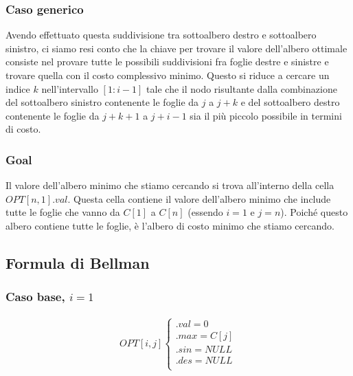 \subsubsection*{Caso generico}

Avendo effettuato questa suddivisione tra sottoalbero destro e sottoalbero sinistro, ci siamo resi conto che la chiave per trovare il valore dell'albero 
ottimale consiste nel provare tutte le possibili suddivisioni fra foglie destre e sinistre e trovare quella con il costo complessivo minimo. Questo si riduce a 
cercare un indice $k$ nell'intervallo $[1 : i - 1]$ tale che il nodo risultante dalla combinazione del sottoalbero sinistro contenente le foglie da $j$ a $j + k$ e del 
sottoalbero destro contenente le foglie da $j + k +1$ a $j + i - 1$ sia il più piccolo possibile in termini di costo.

\newpage
\subsubsection*{Goal}

Il valore dell'albero minimo che stiamo cercando si trova all'interno della cella $OPT[n,1].val$. 
Questa cella contiene il valore dell'albero minimo che include tutte le foglie che vanno da 
$C[1]$ a $C[n]$ (essendo $i = 1$ e $j = n$). 
Poiché questo albero contiene tutte le foglie, è l'albero di costo minimo che stiamo cercando.

\subsection{Formula di Bellman}

\subsubsection*{Caso base, $i = 1$}

\begin{align*}
	OPT[i, j]	
	\begin{cases}
		.val = 0\\                                                                                          
		.max = C[j]\\
		.sin = NULL\\
		.des = NULL\\
	\end{cases}                                                                                            
\end{align*}


